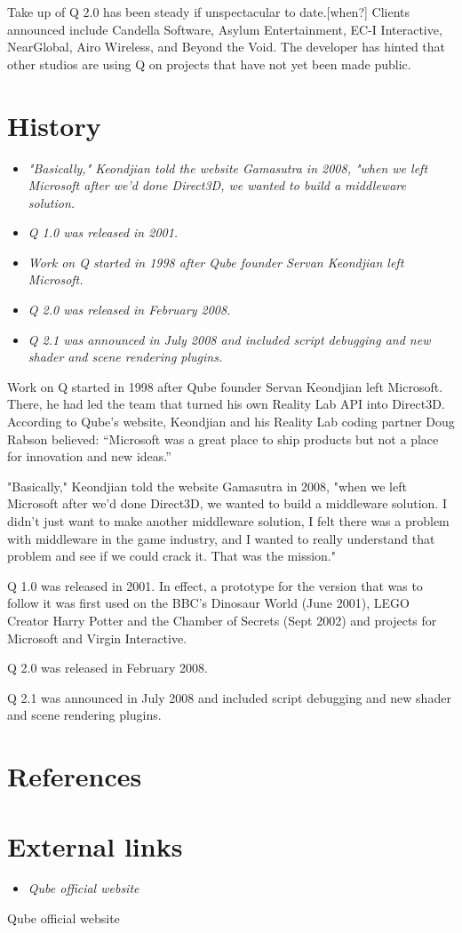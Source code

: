 Take up of Q 2.0 has been steady if unspectacular to date.{[}when?{]}
Clients announced include Candella Software, Asylum Entertainment, EC-I
Interactive, NearGlobal, Airo Wireless, and Beyond the Void. The
developer has hinted that other studios are using Q on projects that
have not yet been made public.

\section{History}\label{history}

\begin{itemize}
\item
  \emph{"Basically," Keondjian told the website Gamasutra in 2008, "when
  we left Microsoft after we'd done Direct3D, we wanted to build a
  middleware solution.}
\item
  \emph{Q 1.0 was released in 2001.}
\item
  \emph{Work on Q started in 1998 after Qube founder Servan Keondjian
  left Microsoft.}
\item
  \emph{Q 2.0 was released in February 2008.}
\item
  \emph{Q 2.1 was announced in July 2008 and included script debugging
  and new shader and scene rendering plugins.}
\end{itemize}

Work on Q started in 1998 after Qube founder Servan Keondjian left
Microsoft. There, he had led the team that turned his own Reality Lab
API into Direct3D. According to Qube's website, Keondjian and his
Reality Lab coding partner Doug Rabson believed: ``Microsoft was a great
place to ship products but not a place for innovation and new ideas.''

"Basically," Keondjian told the website Gamasutra in 2008, "when we left
Microsoft after we'd done Direct3D, we wanted to build a middleware
solution. I didn't just want to make another middleware solution, I felt
there was a problem with middleware in the game industry, and I wanted
to really understand that problem and see if we could crack it. That was
the mission."

Q 1.0 was released in 2001. In effect, a prototype for the version that
was to follow it was first used on the BBC's Dinosaur World (June 2001),
LEGO Creator Harry Potter and the Chamber of Secrets (Sept 2002) and
projects for Microsoft and Virgin Interactive.

Q 2.0 was released in February 2008.

Q 2.1 was announced in July 2008 and included script debugging and new
shader and scene rendering plugins.

\section{References}\label{references}

\section{External links}\label{external-links}

\begin{itemize}
\item
  \emph{Qube official website}
\end{itemize}

Qube official website
